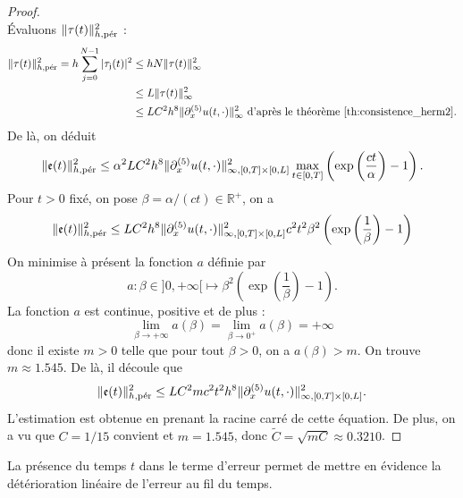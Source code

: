 \begin{proof}
\begin{equation}
\end{equation}
Évaluons $\| \tau(t) \|_{h,\per}^2$ :
\begin{align*}
\|\mathfrak{\tau}(t)\|_{h,\per}^2 = h \gsum_{j=0}^{N-1} |\mathfrak{\tau_j}(t)|^2 & \leq h N \|\mathfrak{\tau}(t)\|_{\infty}^2 \\
	& \leq  L \|\mathfrak{\tau}(t)\|_{\infty}^2 \\
	& \leq L C^2 h^8  \| \partial_x^{(5)} u(t,\cdot) \|_{\infty}^2 \text{ d'après le théorème \ref{th:consistence_herm2}.}
\end{align*}
De là, on déduit
\begin{equation}
\|\mathfrak{e}(t)\|_{h,\per}^2 \leq \alpha^2 L C^2 h^8  \| \partial_x^{(5)} u(t,\cdot) \|_{\infty,[0,T] \times [0,L]}^2 \max_{t \in [0,T]} \left( \exp \left( \dfrac{ct}{\alpha} \right) -1  \right).
\end{equation}
Pour $t>0$ fixé, on pose $\beta = \alpha/(ct) \in \mathbb{R}^+$, on a 
\begin{equation}
\|\mathfrak{e}(t)\|_{h,\per}^2 \leq L C^2 h^8  \| \partial_x^{(5)} u(t,\cdot) \|_{\infty,[0,T] \times [0,L]}^2 c^2 t^2 \beta^2 \left( \exp \left( \dfrac{1}{\beta} \right) -1  \right)
\end{equation}
On minimise à présent la fonction $a$ définie par
\begin{equation}
a :\beta \in ]0 , + \infty[ \mapsto \beta^2 \left( \exp \left( \dfrac{1}{\beta} \right) -1  \right).
\end{equation}
La fonction $a$ est continue, positive et de plus :
\begin{equation}
\lim_{\beta \rightarrow + \infty} a(\beta) = \lim_{\beta \rightarrow 0^+} a(\beta) = + \infty
\end{equation}
donc il existe $m > 0$ telle que pour tout $\beta > 0$, on a $a(\beta)>m$. On trouve $m \approx 1.545$. De là, il découle que
\begin{equation*}
\|\mathfrak{e}(t)\|_{h,\per}^2 \leq L C^2 m c^2 t^2 h^8  \| \partial_x^{(5)} u(t,\cdot) \|_{\infty,[0,T] \times [0,L]}^2.
\end{equation*}
L'estimation est obtenue en prenant la racine carré de cette équation. De plus, on a vu que $C = 1/15$ convient et $m=1.545$, donc $\tilde{C} = \sqrt{mC} \approx 0.3210$.
\end{proof}

La présence du temps $t$ dans le terme d'erreur permet de mettre en évidence la détérioration linéaire de l'erreur au fil du temps. 

